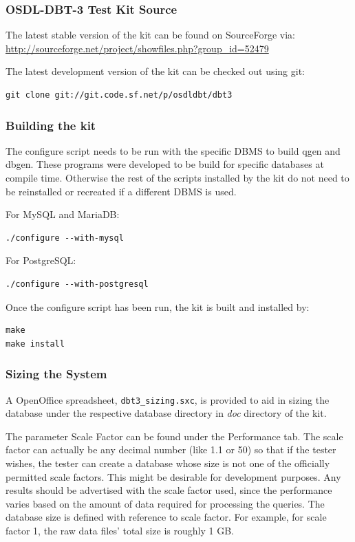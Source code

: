 \documentclass{article}
\begin{document}
\subsubsection{OSDL-DBT-3 Test Kit Source}

The latest stable version of the kit can be found on SourceForge
via: \url{http://sourceforge.net/project/showfiles.php?group\_id=52479}

The latest development version of the kit can be checked out using git:
\lstset{language=sh}
\begin{lstlisting}
git clone git://git.code.sf.net/p/osdldbt/dbt3
\end{lstlisting}

\subsubsection{Building the kit}

The configure script needs to be run with the specific DBMS to build qgen and
dbgen.  These programs were developed to be build for specific databases at
compile time.  Otherwise the rest of the scripts installed by the kit do not
need to be reinstalled or recreated if a different DBMS is used.

For MySQL and MariaDB:
\lstset{language=sh}
\begin{lstlisting}
./configure --with-mysql
\end{lstlisting}

For PostgreSQL:
\lstset{language=sh}
\begin{lstlisting}
./configure --with-postgresql
\end{lstlisting}

Once the configure script has been run, the kit is built and installed by:
\begin{lstlisting}
make
make install
\end{lstlisting}

\subsubsection{Sizing the System}

A OpenOffice spreadsheet, \texttt{dbt3\_sizing.sxc}, is provided to aid in
sizing the database under the respective database directory in \textit{doc}
directory of the kit.

The parameter Scale Factor can be found under the Performance tab.  The scale
factor can actually be any decimal number (like 1.1 or 50) so that if the
tester wishes, the tester can create a database whose size is not one of the
officially permitted scale factors.  This might be desirable for development
purposes.  Any results should be advertised with the scale factor used, since
the performance varies based on the amount of data required for processing the
queries.  The database size is defined with reference to scale factor.  For
example, for scale factor 1, the raw data files' total size is roughly 1 GB.
\end{document}
